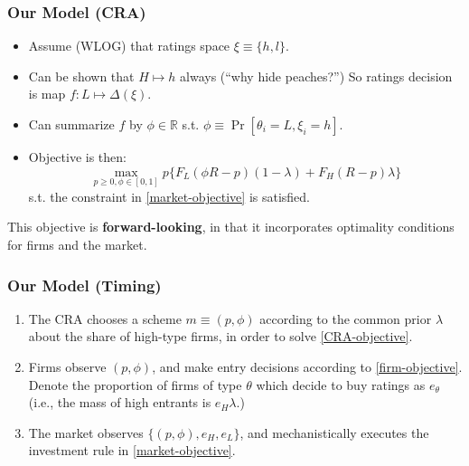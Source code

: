 \documentclass{beamer}
\begin{document}
\begin{frame}
    \frametitle{Our Model (CRA)}
    \begin{itemize}[<+>]
        \item Assume (WLOG) that ratings space $\xi \equiv \{h, l\}$. 
        \item Can be shown that $H \mapsto h$ always (``why hide peaches?'') So ratings decision is map $f: L \mapsto \Delta(\xi)$.
        \item Can summarize $f$ by $\phi \in \mathbb{R}$ s.t. $\phi \equiv \Pr[\theta_i = L, \xi_i = h]$.
        \item Objective is then: 
        \begin{equation}
            \max\limits_{p \geq 0, \phi \in [0, 1]} p \{F_L(\phi R - p)(1 - \lambda) + F_H(R - p)\lambda\}
            \label{CRA-objective}    
        \end{equation} s.t. the constraint in \eqref{market-objective} is satisfied.
    \end{itemize} \pause 

    This objective is \textbf{forward-looking}, in that it incorporates optimality conditions for firms and the market. 
\end{frame}

\begin{frame}
    \frametitle{Our Model (Timing)}
    \begin{enumerate}[<+>]
        \item The CRA chooses a scheme $m \equiv (p, \phi)$ according to the common prior $\lambda$ about the share of high-type firms, in order to solve \eqref{CRA-objective}.
    
        \item Firms observe $(p, \phi)$, and make entry decisions according to \eqref{firm-objective}. Denote the proportion of firms of type $\theta$ which decide to buy ratings as $e_\theta$ (i.e., the mass of high entrants is $e_H \lambda$.)
        
        \item The market observes $\{(p, \phi), e_H, e_L\}$, and mechanistically executes the investment rule in \eqref{market-objective}.    
    \end{enumerate}
\end{frame}
\end{document}
